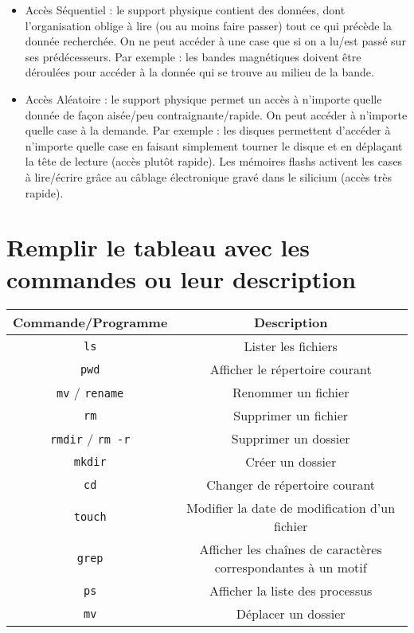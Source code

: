 \documentclass[11pt,a4paper]{article}
\begin{document}
\bigskip
\begin{itemize}
\item Accès Séquentiel : le support physique contient des données, dont l'organisation oblige à lire (ou au moins faire passer) tout ce qui précède la donnée recherchée. On ne peut accéder à une case que si on a lu/est passé sur ses prédécesseurs. Par exemple : les bandes magnétiques doivent être déroulées pour accéder à la donnée qui se trouve au milieu de la bande.\\
\item Accès Aléatoire : le support physique permet un accès à n'importe quelle donnée de façon aisée/peu contraignante/rapide. On peut accéder à n'importe quelle case à la demande. Par exemple : les disques permettent d'accéder à n'importe quelle case en faisant simplement tourner le disque et en déplaçant la tête de lecture (accès plutôt rapide). Les mémoires flashs activent les cases à lire/écrire grâce au câblage électronique gravé dans le silicium (accès très rapide).\\
\end{itemize}
\bigskip

\section{Remplir le tableau avec les commandes ou leur description}


\bigskip
\begin{center}
  \begin{tabular}{| c | c |}
  \hline
  \textbf{Commande/Programme} & \textbf{Description} \\ \hline
  \texttt{ls} & Lister les fichiers \\ \hline
  \texttt{pwd} & Afficher le répertoire courant \\ \hline
  \texttt{mv} / \texttt{rename} & Renommer un fichier \\ \hline
  \texttt{rm} & Supprimer un fichier \\ \hline
  \texttt{rmdir} / \texttt{rm -r} & Supprimer un dossier \\ \hline
  \texttt{mkdir} & Créer un dossier \\ \hline
  \texttt{cd} & Changer de répertoire courant \\ \hline
  \texttt{touch} & Modifier la date de modification d'un fichier \\ \hline
  \texttt{grep} & Afficher les chaînes de caractères correspondantes à un motif \\ \hline
  \texttt{ps} & Afficher la liste des processus \\ \hline
  \texttt{mv} & Déplacer un dossier \\
  \hline
  \end{tabular}
\end{center}
\bigskip
\end{document}
